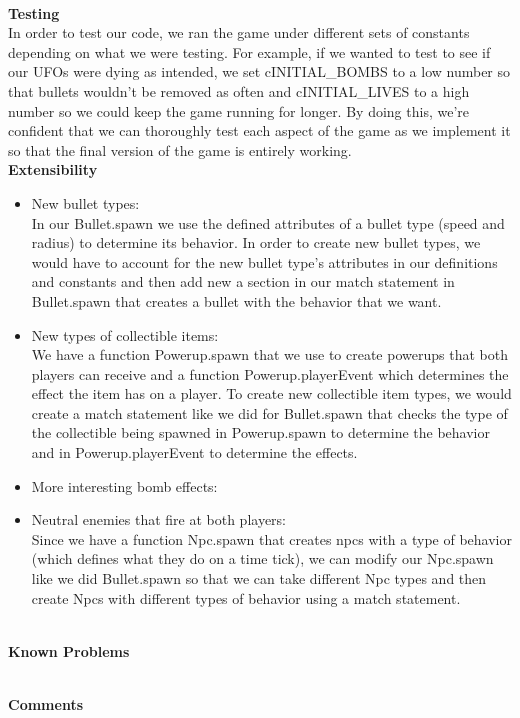 \documentclass{article}[12pt]
\begin{document}
\hspace*{\fill}\\
\Large{\textbf{Testing}}
\hspace*{\fill}\\
In order to test our code, we ran the game under different sets of constants depending on what we were testing. For example, if we wanted to test to see if our UFOs were dying as intended, we set cINITIAL\_BOMBS to a low number so that bullets wouldn't be removed as often and cINITIAL\_LIVES to a high number so we could keep the game running for longer. By doing this, we're confident that we can thoroughly test each aspect of the game as we implement it so that the final version of the game is entirely working.
\hspace*{\fill}\\[\baselineskip]
\Large{\textbf{Extensibility}}
\hspace*{\fill}
\begin{itemize}
	\item New bullet types: \\
					In our Bullet.spawn we use the defined attributes of a bullet type (speed and radius) to determine its behavior. In order to create new bullet types, we would have to account for the new bullet type's attributes in our definitions and constants and then add new a section in our match statement in Bullet.spawn that creates a bullet with the behavior that we want.
	\item New types of collectible items: \\
					We have a function Powerup.spawn that we use to create powerups that both players can receive and a function Powerup.playerEvent which determines the effect the item has on a player. To create new collectible item types, we would create a match statement like we did for Bullet.spawn that checks the type of the collectible being spawned in Powerup.spawn to determine the behavior and in Powerup.playerEvent to determine the effects.
	\item More interesting bomb effects: \\
	\item Neutral enemies that fire at both players: \\
					Since we have a function Npc.spawn that creates npcs with a type of behavior (which defines what they do on a time tick), we can modify our Npc.spawn like we did Bullet.spawn so that we can take different Npc types and then create Npcs with different types of behavior using a match statement.
\end{itemize}
\hspace*{\fill}\\
\Large{\textbf{Known Problems}}
\hspace*{\fill}

\hspace*{\fill}\\[\baselineskip]
\Large{\textbf{Comments}}
\hspace*{\fill}
\end{document}

